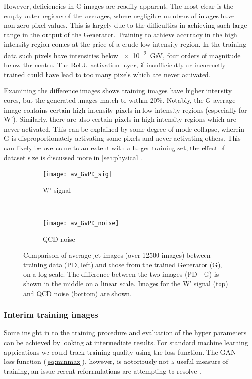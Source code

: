 \documentclass[twocolumn]{article}
\newcommand{\gev}{\giga\electronvolt}
\begin{document}
However, deficiencies in G images are readily apparent. The most clear is the empty outer regions of the averages, where negligible numbers of images have non-zero pixel values. This is largely due to the difficulties in achieving such large range in the output of the Generator. Training to achieve accuracy in the high intensity region comes at the price of a crude low intensity region. In the training data such pixels have intensities below \SI{e-2}{\gev}, four orders of magnitude below the centre. The ReLU activation layer, if insufficiently or incorrectly trained could have lead to too many pixels which are never activated.

Examining the difference images shows training images have higher intensity cores, but the generated images match to within 20\%. Notably, the G average image contains certain high intensity pixels in low intensity regions (especially for W'). Similarly, there are also certain pixels in high intensity regions which are never activated. This can be explained by some degree of mode-collapse, wherein G is disproportionately activating some pixels and never activating others. This can likely be overcome to an extent with a larger training set, the effect of dataset size is discussed more in \cref{sec:physical}.  

\begin{figure}[!htbp]
	\centering
	\begin{subfigure}[t]{1.0\textwidth}
		\centering
		\texttt{[image: av\_GvPD\_sig]}
		\caption{W' signal}
	\end{subfigure}%
	\\
	\begin{subfigure}[t]{1.0\textwidth}
		\centering
		\texttt{[image: av\_GvPD\_noise]}
		\caption{QCD noise}
	\end{subfigure}
	
	\caption{Comparison of average jet-images (over \num{12500} images) between training data (PD, left) and those from the trained Generator (G), on a log scale. The difference between the two images (PD - G) is shown in the middle on a linear scale. Images for the W' signal (top) and QCD noise (bottom) are shown.}
	\label{fig:pdvg}
\end{figure}


\subsubsection{Interim training images}
Some insight in to the training procedure and evaluation of the hyper parameters can be achieved by looking at intermediate results. For standard machine learning applications we could track training quality using the loss function. The GAN loss function (\cref{eq:minmax}), however, is notoriously not a useful measure of training, an issue recent reformulations are attempting to resolve \cite{wasserstein}. 
\end{document}
